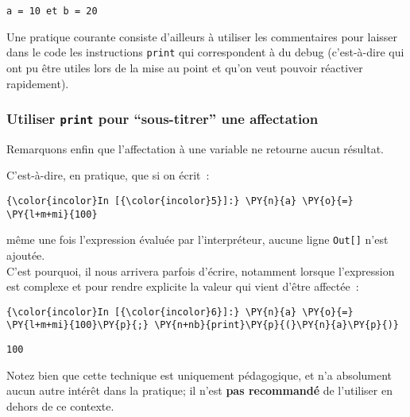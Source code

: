     \begin{Verbatim}[commandchars=\\\{\}]
a = 10 et b = 20

    \end{Verbatim}

    Une pratique courante consiste d'ailleurs à utiliser les commentaires
pour laisser dans le code les instructions \texttt{print} qui
correspondent à du debug (c'est-à-dire qui ont pu être utiles lors de la
mise au point et qu'on veut pouvoir réactiver rapidement).

    \hypertarget{utiliser-print-pour-sous-titrer-une-affectation}{%
\subsubsection{\texorpdfstring{Utiliser \texttt{print} pour
``sous-titrer'' une
affectation}{Utiliser print pour ``sous-titrer'' une affectation}}\label{utiliser-print-pour-sous-titrer-une-affectation}}

    Remarquons enfin que l'affectation à une variable ne retourne aucun
résultat.

C'est-à-dire, en pratique, que si on écrit~:

    \begin{Verbatim}[commandchars=\\\{\}]
{\color{incolor}In [{\color{incolor}5}]:} \PY{n}{a} \PY{o}{=} \PY{l+m+mi}{100}
\end{Verbatim}


    même une fois l'expression évaluée par l'interpréteur, aucune ligne
\texttt{Out{[}{]}} n'est ajoutée.\\

    C'est pourquoi, il nous arrivera parfois d'écrire, notamment lorsque
l'expression est complexe et pour rendre explicite la valeur qui vient
d'être affectée~:

    \begin{Verbatim}[commandchars=\\\{\}]
{\color{incolor}In [{\color{incolor}6}]:} \PY{n}{a} \PY{o}{=} \PY{l+m+mi}{100}\PY{p}{;} \PY{n+nb}{print}\PY{p}{(}\PY{n}{a}\PY{p}{)}
\end{Verbatim}


    \begin{Verbatim}[commandchars=\\\{\}]
100

    \end{Verbatim}

    Notez bien que cette technique est uniquement pédagogique, et n'a
absolument aucun autre intérêt dans la pratique; il n'est \textbf{pas
recommandé} de l'utiliser en dehors de ce contexte.